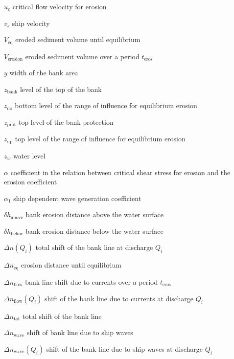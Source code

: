 \begin{symbollist}
\item[$u_c$] critical flow velocity for erosion 
\item[$v_s$] ship velocity 
\item[$V_\text{eq}$] eroded sediment volume until equilibrium 
\item[$V_\text{erosion}$] eroded sediment volume over a period $t_\text{eros}$ 
\item[$y$] width of the bank area 
\item[$z_\text{bank}$] level of the top of the bank 
\item[$z_\text{do}$] bottom level of the range of influence for equilibrium erosion 
\item[$z_\text{prot}$] top level of the bank protection 
\item[$z_\text{up}$] top level of the range of influence for equilibrium erosion 
\item[$z_w$] water level 
\item[$\alpha$] coefficient in the relation between critical shear stress for erosion and the erosion coefficient 
\item[$\alpha_1$] ship dependent wave generation coefficient \unitbrackets{-}
\item[$\delta h_\text{above}$] bank erosion distance above the water surface 
\item[$\delta h_\text{below}$] bank erosion distance below the water surface 
\item[$\Delta n(Q_i)$] total shift of the bank line at discharge $Q_i$ 
\item[$\Delta n_\text{eq}$] erosion distance until equilibrium 
\item[$\Delta n_\text{flow}$] bank line shift due to currents over a period $t_\text{eros}$ 
\item[$\Delta n_\text{flow}(Q_i)$] shift of the bank line due to currents at discharge $Q_i$ 
\item[$\Delta n_\text{tot}$]  total shift of the bank line 
\item[$\Delta n_\text{wave}$] shift of bank line due to ship waves 
\item[$\Delta n_\text{wave}(Q_i)$] shift of the bank line due to ship waves at discharge $Q_i$ 

\end{symbollist}
